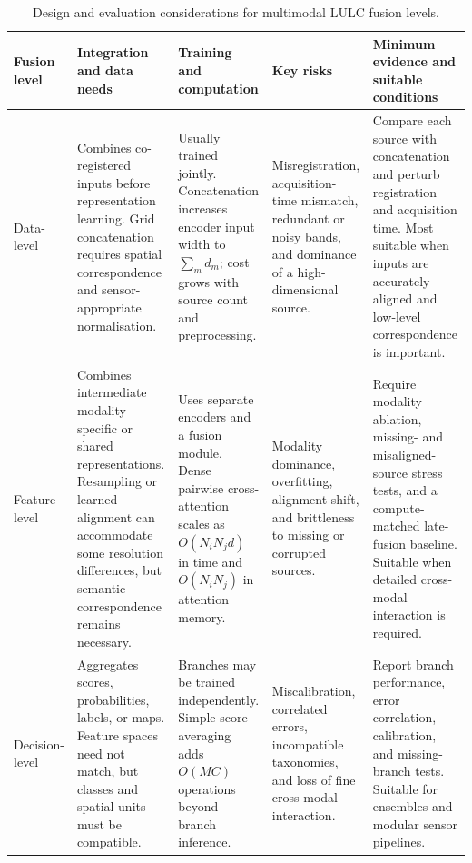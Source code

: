 \documentclass[]{interact}
\theoremstyle{plain}%
\theoremstyle{definition}
\theoremstyle{remark}
\begin{document}
\begin{table}[!htbp]
	\centering
	\color{DIFaddcolor}
	\caption{Design and evaluation considerations for multimodal LULC fusion levels.}
	\label{tab:fusion_levels}
	\footnotesize
	\setlength{\tabcolsep}{2pt}
	\renewcommand{\arraystretch}{1.18}
	\begin{tabular}{@{} >{\raggedright\arraybackslash}p{1.25cm} >{\raggedright\arraybackslash}p{2.90cm} >{\raggedright\arraybackslash}p{3.00cm} >{\raggedright\arraybackslash}p{2.65cm} >{\raggedright\arraybackslash}p{3.65cm} @{}}
		\toprule
		\textbf{Fusion level} & \textbf{Integration and data needs} & \textbf{Training and computation} & \textbf{Key risks} & \textbf{Minimum evidence and suitable conditions} \\
		\midrule
		Data-level & Combines co-registered inputs before representation learning. Grid concatenation requires spatial correspondence and sensor-appropriate normalisation. & Usually trained jointly. Concatenation increases encoder input width to $\sum_m d_m$; cost grows with source count and preprocessing. & Misregistration, acquisition-time mismatch, redundant or noisy bands, and dominance of a high-dimensional source. & Compare each source with concatenation and perturb registration and acquisition time. Most suitable when inputs are accurately aligned and low-level correspondence is important. \\
		\addlinespace[2pt]
		Feature-level & Combines intermediate modality-specific or shared representations. Resampling or learned alignment can accommodate some resolution differences, but semantic correspondence remains necessary. & Uses separate encoders and a fusion module. Dense pairwise cross-attention scales as $O(N_iN_jd)$ in time and $O(N_iN_j)$ in attention memory. & Modality dominance, overfitting, alignment shift, and brittleness to missing or corrupted sources. & Require modality ablation, missing- and misaligned-source stress tests, and a compute-matched late-fusion baseline. Suitable when detailed cross-modal interaction is required. \\
		\addlinespace[2pt]
		Decision-level & Aggregates scores, probabilities, labels, or maps. Feature spaces need not match, but classes and spatial units must be compatible. & Branches may be trained independently. Simple score averaging adds $O(MC)$ operations beyond branch inference. & Miscalibration, correlated errors, incompatible taxonomies, and loss of fine cross-modal interaction. & Report branch performance, error correlation, calibration, and missing-branch tests. Suitable for ensembles and modular sensor pipelines. \\

\end{tabular}
\end{table}
\end{document}
